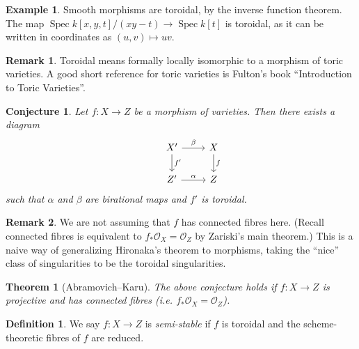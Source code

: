 \documentclass{article}
\newtheorem*{conjecture}{Conjecture}
\newtheorem*{theorem}{Theorem}
\theoremstyle{definition}
\newtheorem*{definition}{Definition}
\newtheorem*{example}{Example}
\newtheorem*{remark}{Remark}
\DeclareMathOperator{\Spec}{Spec}
\renewcommand{\O}{\mathcal{O}}
\begin{document}
\begin{example}
    Smooth morphisms are toroidal, by the inverse function theorem. The map
    $\Spec k[x,y,t]/(xy-t)\to\Spec k[t]$ is toroidal, as it can be written in
    coordinates as $(u,v)\mapsto uv$.
\end{example}

\begin{remark}
    Toroidal means formally locally isomorphic to a morphism of toric varieties.
    A good short reference for toric varieties is Fulton's book ``Introduction
    to Toric Varieties''.
\end{remark}

\begin{conjecture}
    Let $f:X\to Z$ be a morphism of varieties. Then there exists a diagram
    \begin{equation*}
        \begin{tikzcd}
            &X' \ar[r,"\beta"] \ar[d,"f'"] &X \ar[d,"f"] \\
            &Z' \ar[r,"\alpha"] &Z
        \end{tikzcd}
    \end{equation*}
    such that $\alpha$ and $\beta$ are birational maps and $f'$ is toroidal.
\end{conjecture}

\begin{remark}
    We are not assuming that $f$ has connected fibres here. (Recall connected
    fibres is equivalent to $f_*\O_X=\O_Z$ by Zariski's main theorem.) This is a
    naive way of generalizing Hironaka's theorem to morphisms, taking the
    ``nice'' class of singularities to be the toroidal singularities.
\end{remark}

\begin{theorem}[Abramovich--Karu]
    The above conjecture holds if $f:X\to Z$ is projective and has connected
    fibres (i.e. $f_*\O_X=\O_Z$).
\end{theorem}

\begin{definition}
    We say $f:X\to Z$ is \emph{semi-stable} if $f$ is toroidal and the
    scheme-theoretic fibres of $f$ are reduced.
\end{definition}
\end{document}
